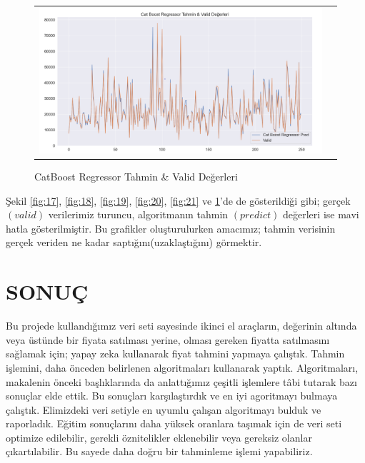 \documentclass[conference]{IEEEtran}
\begin{document}
\begin{figure}[!h]
	\centering
	\begin{center}
		\begin{tabular}{cc}
			\includegraphics[scale=0.18]{pictures/pic_22.png}&
		\end{tabular}
	\end{center}
	\caption{CatBoost Regressor Tahmin \& Valid Değerleri}
	\label{fig:22}
\end{figure}
\pagebreak

\quad Şekil \ref{fig:17}, \ref{fig:18}, \ref{fig:19}, \ref{fig:20}, \ref{fig:21} ve \ref{fig:22}'de de gösterildiği gibi; gerçek $(valid)$ verilerimiz turuncu, algoritmanın tahmin $(predict)$ değerleri ise mavi hatla gösterilmiştir. Bu grafikler oluşturulurken amacımız; tahmin verisinin gerçek veriden ne kadar saptığını(uzaklaştığını) görmektir.

\section{\textbf{SONUÇ}}

\quad Bu projede kullandığımız veri seti sayesinde ikinci el araçların, değerinin altında veya üstünde bir fiyata satılması yerine, olması gereken fiyatta satılmasını sağlamak için; yapay zeka kullanarak fiyat tahmini yapmaya çalıştık. Tahmin işlemini, daha önceden belirlenen algoritmaları kullanarak yaptık. Algoritmaları, makalenin önceki başlıklarında da anlattığımız çeşitli işlemlere tâbi tutarak bazı sonuçlar elde ettik. Bu sonuçları karşılaştırdık ve en iyi agoritmayı bulmaya çalıştık. Elimizdeki veri setiyle en uyumlu çalışan algoritmayı bulduk ve raporladık. Eğitim sonuçlarını daha yüksek oranlara taşımak için de veri seti optimize edilebilir, gerekli öznitelikler eklenebilir veya gereksiz olanlar çıkartılabilir. Bu sayede daha doğru bir tahminleme işlemi yapabiliriz.
\end{document}
